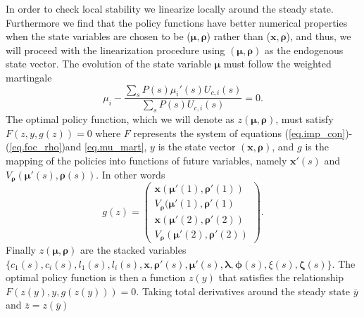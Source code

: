 \documentclass[thmsb,11pt]{article}
\newcommand{\bmat}{\begin{matrix}}
\newcommand{\emat}{\end{matrix}}
\newcommand{\ov}{\overline}
\begin{document}
In order to check local stability we linearize locally around the steady state. Furthermore we find that the policy functions have better numerical properties when the state variables are chosen to be ($\bm \mu,\bm \rho$) rather than ($\bm x,\bm \rho$), and thus, we will proceed with the linearization procedure using $(\bm \mu,\bm \rho)$ as the endogenous state vector.  The evolution of the state variable $\bm  \mu$ must follow the weighted martingale
\begin{equation}
	\mu_i - \frac{\sum_s P(s) \mu_i'(s)U_{c,i}(s)}{\sum_s P(s) U_{c,i}(s)} = 0\label{eq.mu_mart}.
\end{equation}  The optimal policy function, which we will denote as $z(\bm \mu,\bm\rho)$, must satisfy $F(z,y,g(z)) = 0$ where $F$ represents the system of equations (\ref{eq.imp_con})-(\ref{eq.foc_rho})and \eqref{eq.mu_mart}, $y$ is the state vector $(\bm x,\bm \rho)$, and $g$ is the mapping of the policies into functions of future variables, namely $\bm x'(s)$ and $V_{\bm \rho}(\bm \mu'(s),\bm \rho(s))$.  In other words
\[
	g(z) = \left(\bmat \bm x(\bm \mu'(1),\bm \rho'(1))\\ V_{\bm \rho}(\bm \mu'(1),\bm \rho'(1)\\ \bm x(\bm \mu'(2),\bm \rho'(2))\\ V_{\bm \rho}(\bm \mu'(2),\bm \rho'(2))\emat\right).
\]  Finally $z(\bm \mu,\bm \rho)$ are the stacked variables $\{c_1(s),c_i(s),l_1(s),l_i(s),\bm x,\bm \rho'(s),\bm \mu'(s),\bm \lambda,\bm \phi(s),\xi(s),\bm \zeta(s)\}$.  The optimal policy function is then a function $z(y)$ that satisfies the relationship $F(z(y),y,g(z(y))) = 0$.  Taking total derivatives around the steady state $\ov y$ and $\ov z = z(\ov y)$
\end{document}
